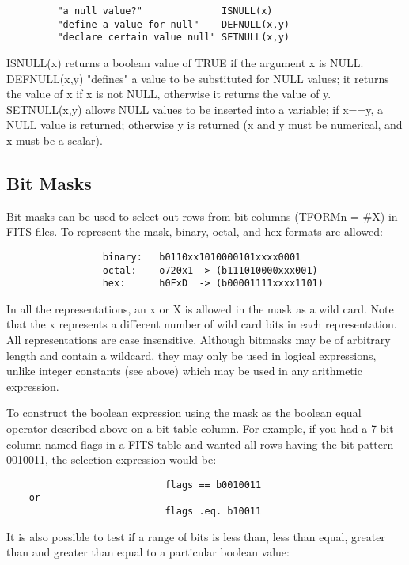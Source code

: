 \documentclass[11pt]{book}
\begin{document}
\begin{verbatim}
         "a null value?"              ISNULL(x)
         "define a value for null"    DEFNULL(x,y)
         "declare certain value null" SETNULL(x,y)
\end{verbatim}
    ISNULL(x)
    returns a boolean value of TRUE if the  argument  x  is  NULL. DEFNULL(x,y)
    "defines"  a  value  to  be  substituted  for NULL values; it
    returns the value of x if x is not NULL, otherwise  it  returns  the
    value of y.  SETNULL(x,y) allows NULL values to be inserted into
    a variable; if x==y, a NULL value is returned; otherwise y is returned
    (x and y must be numerical, and x must be a scalar).

\subsection{Bit Masks}

    Bit  masks can be used to select out rows from bit columns (TFORMn =
    \#X) in FITS files. To represent the mask,  binary,  octal,  and  hex
    formats are allowed:


\begin{verbatim}
                 binary:   b0110xx1010000101xxxx0001
                 octal:    o720x1 -> (b111010000xxx001)
                 hex:      h0FxD  -> (b00001111xxxx1101)
\end{verbatim}

    In  all  the  representations, an x or X is allowed in the mask as a
    wild card. Note that the x represents a  different  number  of  wild
    card  bits  in  each  representation.  All  representations are case
    insensitive.  Although bitmasks may be of arbitrary length and contain
    a wildcard, they may only be used in logical expressions, unlike 
    integer constants (see above) which may be used in any arithmetic
    expression.

    To construct the boolean expression using the mask  as  the  boolean
    equal  operator  described above on a bit table column. For example,
    if you had a 7 bit column named flags in a  FITS  table  and  wanted
    all  rows  having  the bit pattern 0010011, the selection expression
    would be:


\begin{verbatim}
                            flags == b0010011
    or
                            flags .eq. b10011
\end{verbatim}

    It is also possible to test if a range of bits is  less  than,  less
    than  equal,  greater  than  and  greater than equal to a particular
    boolean value:
\end{document}
